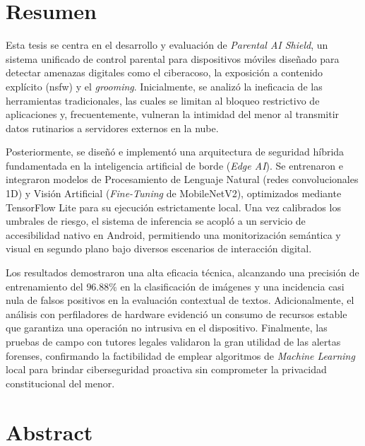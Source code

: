 \thispagestyle{plain}
\chapter*{Resumen}

Esta tesis se centra en el desarrollo y evaluación de \textit{Parental AI Shield}, un sistema unificado de control parental para dispositivos móviles diseñado para detectar amenazas digitales como el ciberacoso, la exposición a contenido explícito (\gls{nsfw}) y el \textit{grooming}. Inicialmente, se analizó la ineficacia de las herramientas tradicionales, las cuales se limitan al bloqueo restrictivo de aplicaciones y, frecuentemente, vulneran la intimidad del menor al transmitir datos rutinarios a servidores externos en la nube.

Posteriormente, se diseñó e implementó una arquitectura de seguridad híbrida fundamentada en la inteligencia artificial de borde (\textit{Edge AI}). Se entrenaron e integraron modelos de Procesamiento de Lenguaje Natural (redes convolucionales 1D) y Visión Artificial (\textit{Fine-Tuning} de MobileNetV2), optimizados mediante TensorFlow Lite para su ejecución estrictamente local. Una vez calibrados los umbrales de riesgo, el sistema de inferencia se acopló a un servicio de accesibilidad nativo en Android, permitiendo una monitorización semántica y visual en segundo plano bajo diversos escenarios de interacción digital.

Los resultados demostraron una alta eficacia técnica, alcanzando una precisión de entrenamiento del $96.88\%$ en la clasificación de imágenes y una incidencia casi nula de falsos positivos en la evaluación contextual de textos. Adicionalmente, el análisis con perfiladores de hardware evidenció un consumo de recursos estable que garantiza una operación no intrusiva en el dispositivo. Finalmente, las pruebas de campo con tutores legales validaron la gran utilidad de las alertas forenses, confirmando la factibilidad de emplear algoritmos de \textit{Machine Learning} local para brindar ciberseguridad proactiva sin comprometer la privacidad constitucional del menor.


\MediaOptionLogicBlank

\chapter*{Abstract}

